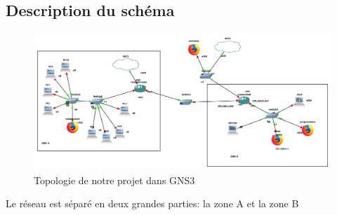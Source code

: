 \documentclass[a4paper,12pt,french]{report} %
\begin{document}
\subsection{Description du schéma}
\begin{figure}[H]
\includegraphics[width=520pt]{figure/topologie_gns3.png}
\centering
\caption{Topologie de notre projet dans GNS3}	
\end{figure}
Le réseau est séparé en deux grandes parties: la zone A et la zone B
\end{document}
